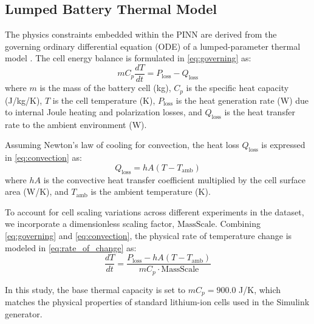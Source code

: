 \subsection{Lumped Battery Thermal Model}
The physics constraints embedded within the PINN are derived from the governing ordinary differential equation (ODE) of a lumped-parameter thermal model \cite{bernardi1985general}. The cell energy balance is formulated in \eqref{eq:governing} as:
\begin{equation}
m C_p \frac{dT}{dt} = P_{\text{loss}} - Q_{\text{loss}}
\label{eq:governing}
\end{equation}
where $m$ is the mass of the battery cell (kg), $C_p$ is the specific heat capacity (J/kg/K), $T$ is the cell temperature (K), $P_{\text{loss}}$ is the heat generation rate (W) due to internal Joule heating and polarization losses, and $Q_{\text{loss}}$ is the heat transfer rate to the ambient environment (W).

Assuming Newton's law of cooling for convection, the heat loss $Q_{\text{loss}}$ is expressed in \eqref{eq:convection} as:
\begin{equation}
Q_{\text{loss}} = hA (T - T_{\text{amb}})
\label{eq:convection}
\end{equation}
where $hA$ is the convective heat transfer coefficient multiplied by the cell surface area (W/K), and $T_{\text{amb}}$ is the ambient temperature (K). 

To account for cell scaling variations across different experiments in the dataset, we incorporate a dimensionless scaling factor, $\text{MassScale}$. Combining \eqref{eq:governing} and \eqref{eq:convection}, the physical rate of temperature change is modeled in \eqref{eq:rate_of_change} as:
\begin{equation}
\frac{dT}{dt} = \frac{P_{\text{loss}} - hA (T - T_{\text{amb}})}{m C_p \cdot \text{MassScale}}
\label{eq:rate_of_change}
\end{equation}

In this study, the base thermal capacity is set to $m C_p = 900.0$ J/K, which matches the physical properties of standard lithium-ion cells used in the Simulink generator.

